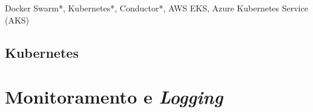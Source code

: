 Docker Swarm*, Kubernetes*, Conductor*, AWS EKS, Azure Kubernetes Service (AKS)

\subsection{Kubernetes}










\section{Monitoramento e \emph{Logging}}

